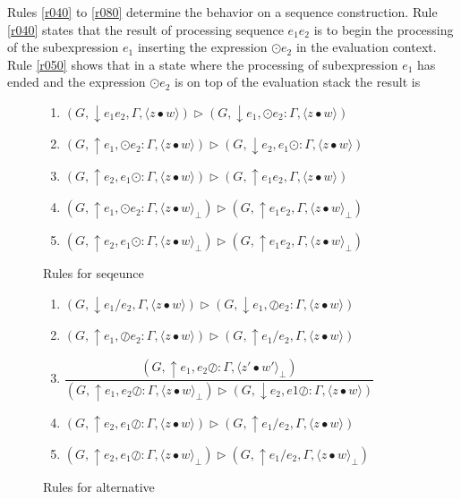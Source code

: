 \documentclass[manuscript, review, sigconf]{acmart}
\newcommand{\zpp}[2]{\langle #1\bullet #2 \rangle}
\newcommand{\zppf}[2]{\langle #1\bullet #2 \rangle_{\bot}}
\begin{document}
Rules \ref{r040} to \ref{r080} determine the behavior on a sequence construction. Rule \ref{r040} states that the result of processing sequence $e_1e_2$  is 
to begin the processing of the subexpression $e_1$ inserting the expression $\odot e_2$ in the evaluation context. Rule 
\ref{r050} shows that in a state where  the processing of subexpression $e_1$ has ended and the expression $\odot e_2$ is on top of the 
evaluation stack the result is 

\begin{figure}[H]
\begin{enumerate}\addtocounter{enumi}{4}
  \item \label{r040} $(G, \downarrow e_1e_2,\Gamma ,\zpp{z}{w})    \rhd  (G, \downarrow e_1,  \odot e_2 : \Gamma, \zpp{z}{w})$ 
  \item \label{r050} $(G, \uparrow e_1 ,\odot e_2 : \Gamma ,\zpp{z}{w})   \rhd  (G, \downarrow e_2, e_1 \odot : \Gamma, \zpp{z}{w})$ 
  \item \label{r060} $(G, \uparrow e_2 ,e_1 \odot  : \Gamma ,\zpp{z}{w})   \rhd  (G, \uparrow e_1e_2, \Gamma, \zpp{z}{w})$
  \item \label{r070} $(G, \uparrow e_1 ,  \odot e_2 : \Gamma ,\zppf{z}{w})   \rhd  (G, \uparrow e_1 e_2, \Gamma, \zppf{z}{w})$ 
  \item \label{r080} $(G, \uparrow e_2 ,e_1 \odot  : \Gamma ,\zppf{z}{w})   \rhd  (G, \uparrow e_1e_2, \Gamma, \zppf{z}{w})$
\end{enumerate}
 \caption{Rules for seqeunce}
 \label{fig:rule-seq}
\end{figure}

\begin{figure}[H]
\begin{enumerate}\addtocounter{enumi}{9}
  \item \label{r090} $(G, \downarrow e_1 / e_2,\Gamma ,\zpp{z}{w})          \rhd  (G, \downarrow e_1,  \oslash e_2 : \Gamma, \zpp{z}{w})$ 
  \item \label{r100} $(G, \uparrow e_1 ,\oslash e_2 : \Gamma ,\zpp{z}{w})   \rhd  (G, \uparrow e_1 / e_2 , \Gamma, \zpp{z}{w})$ 
  \item \label{r110} $\dfrac{(G, \uparrow e_1 ,e_2 \oslash  : \Gamma ,\zppf{z'}{w'})}{(G, \uparrow e_1 ,e_2 \oslash  : \Gamma ,\zppf{z}{w}) \rhd  (G, \downarrow e_2 , e1 \oslash : \Gamma, \zpp{z}{w})}$
  \item \label{r120} $(G, \uparrow e_2 ,e_1 \oslash  : \Gamma ,\zpp{z}{w})  \rhd  (G, \uparrow e_1 / e_2, \Gamma, \zpp{z}{w})$ 
  \item \label{r130} $(G, \uparrow e_2 ,e_1 \oslash  : \Gamma ,\zppf{z}{w}) \rhd  (G, \uparrow e_1 / e_2, \Gamma, \zppf{z}{w})$
\end{enumerate}
 \caption{Rules for alternative}
 \label{fig:rule-seq}
\end{figure}
\end{document}

